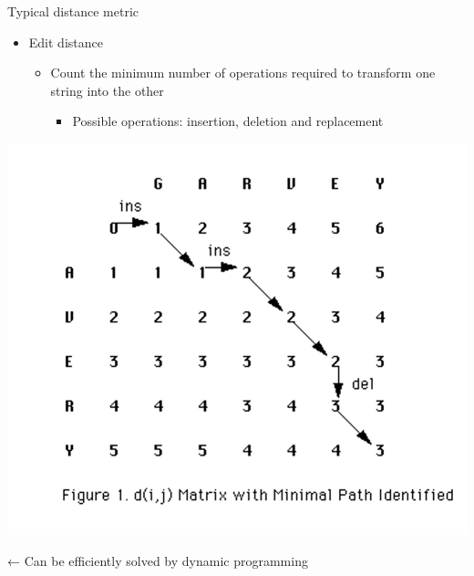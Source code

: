 \documentclass[
  ignorenonframetext,
]{beamer}
\providecommand{\tightlist}{%
  \setlength{\itemsep}{0pt}\setlength{\parskip}{0pt}}
\begin{document}
\begin{frame}{Typical distance metric}
\protect\hypertarget{typical-distance-metric-1}{}
\begin{itemize}
\item
  Edit distance

  \begin{itemize}
  \item
    Count the minimum number of operations required to transform one
    string into the other

    \begin{itemize}
    \tightlist
    \item
      Possible operations: insertion, deletion and replacement
    \end{itemize}
  \end{itemize}
\end{itemize}

\begin{flushright}\includegraphics[width=0.7\linewidth]{img/page 13} \end{flushright}

← Can be efficiently solved by dynamic programming
\end{frame}
\end{document}
